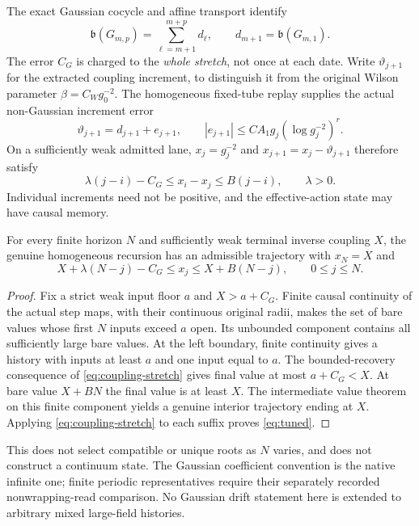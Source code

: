 The exact Gaussian cocycle and affine transport identify
\[
 \mathfrak b(G_{m,p})=\sum_{\ell=m+1}^{m+p}d_\ell,
 \qquad d_{m+1}=\mathfrak b(G_{m,1}).
\]
The error $C_G$ is charged to the \emph{whole stretch}, not once at each date. Write $\vartheta_{j+1}$ for the extracted coupling increment, to distinguish it from the original Wilson parameter $\beta=C_Wg_0^{-2}$. The homogeneous fixed-tube replay supplies the actual non-Gaussian increment error
\[
 \vartheta_{j+1}=d_{j+1}+e_{j+1},\qquad
 |e_{j+1}|\le C A_1g_j(\log g_j^{-2})^r.
\]
On a sufficiently weak admitted lane, $x_j=g_j^{-2}$ and $x_{j+1}=x_j-\vartheta_{j+1}$ therefore satisfy
\begin{equation}\label{eq:coupling-stretch}
 \lambda(j-i)-C_G\le x_i-x_j\le B(j-i),\qquad\lambda>0.
\end{equation}
Individual increments need not be positive, and the effective-action state may have causal memory.

\begin{proposition}
For every finite horizon $N$ and sufficiently weak terminal inverse coupling $X$, the genuine homogeneous recursion has an admissible trajectory with $x_N=X$ and
\begin{equation}\label{eq:tuned}
 X+\lambda(N-j)-C_G\le x_j\le X+B(N-j),\qquad0\le j\le N.
\end{equation}
\end{proposition}

\begin{proof}
Fix a strict weak input floor $a$ and $X>a+C_G$. Finite causal continuity of the actual step maps, with their continuous original radii, makes the set of bare values whose first $N$ inputs exceed $a$ open. Its unbounded component contains all sufficiently large bare values. At the left boundary, finite continuity gives a history with inputs at least $a$ and one input equal to $a$. The bounded-recovery consequence of \eqref{eq:coupling-stretch} gives final value at most $a+C_G<X$. At bare value $X+BN$ the final value is at least $X$. The intermediate value theorem on this finite component yields a genuine interior trajectory ending at $X$. Applying \eqref{eq:coupling-stretch} to each suffix proves \eqref{eq:tuned}.
\end{proof}

This does not select compatible or unique roots as $N$ varies, and does not construct a continuum state. The Gaussian coefficient convention is the native infinite one; finite periodic representatives require their separately recorded nonwrapping-read comparison. No Gaussian drift statement here is extended to arbitrary mixed large-field histories.

